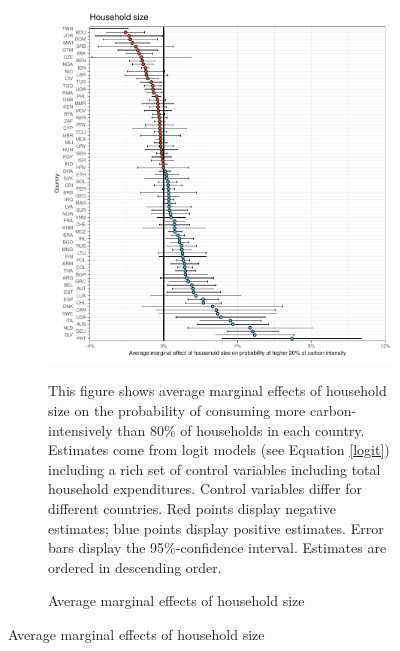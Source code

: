  \begin{figure}[ht!]\ContinuedFloat
   \centering
   \begin{subfigure}[b]{\textwidth}
   \centering
   \includegraphics{1_Figures/Analysis_Logit_Models_Marginal_Effects/Average_Marginal_Effects_affected_upper_80_hh_size_2017B.pdf}
   \caption{Average marginal effects of household size} \label{fig:Logit_ME_size}
   \begin{subcaption2}
     This figure shows average marginal effects of household size on the probability of consuming more carbon-intensively than 80\% of households in each country. Estimates come from logit models (see Equation \ref{logit}) including a rich set of control variables including total household expenditures. Control variables differ for different countries. Red points display negative estimates; blue points display positive estimates. Error bars display the 95\%-confidence interval. Estimates are ordered in descending order.
   \end{subcaption2}
   \end{subfigure}
 \end{figure}
 \clearpage

